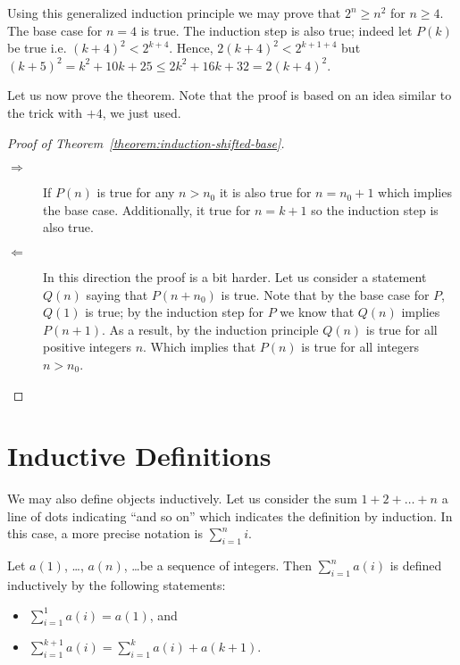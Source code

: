 Using this generalized induction principle we may prove that $2^n \ge n^2$ for
$n \ge 4$. The base case for $n = 4$ is true. The induction step is also true;
indeed let $P(k)$ be true i.e. $(k + 4)^2 < 2^{k + 4}$. Hence,
$2(k + 4)^2 < 2^{k + 1 + 4}$ but
$(k + 5)^2 = k^2 + 10k + 25 \le 2k^2 + 16k + 32 = 2(k + 4)^2$.

Let us now prove the theorem. Note that the proof is based on an idea similar
to the trick with $+4$, we just used.
\begin{proof}[Proof of Theorem~\ref{theorem:induction-shifted-base}]
    \begin{description}
        \item[$\Rightarrow$] If $P(n)$ is true for any $n > n_0$ it is also true
            for $n = n_0 + 1$ which implies the base case. Additionally, it true for
            $n = k + 1$ so the induction step is also true.
        \item[$\Leftarrow$] In this direction the proof is a bit harder. Let us
            consider a statement $Q(n)$ saying that $P(n + n_0)$ is true. Note that
            by the base case for $P$, $Q(1)$ is true; by the induction step for $P$
            we know that $Q(n)$ implies $P(n + 1)$. As a result, by the induction
            principle $Q(n)$ is true for all positive integers $n$. Which implies
            that $P(n)$ is true for all integers $n > n_0$.
    \end{description}
\end{proof}

\section{Inductive Definitions}

We may also define objects inductively. Let us consider the sum
$1 + 2 + \dots + n$ a line of dots indicating ``and so on'' which indicates the
definition by induction. In this case, a more precise notation is
$\sum_{i = 1}^n i$.

\begin{definition}
    Let $a(1)$, \dots, $a(n)$, \dots be a sequence of integers. Then
    $\sum_{i = 1}^n a(i)$ is defined inductively by the following
    statements:
    \begin{itemize}
        \item $\sum_{i = 1}^1 a(i) = a(1)$, and
        \item $\sum_{i = 1}^{k + 1} a(i) =
            \sum_{i = 1}^k a(i) + a(k + 1)$.
    \end{itemize}
\end{definition}

